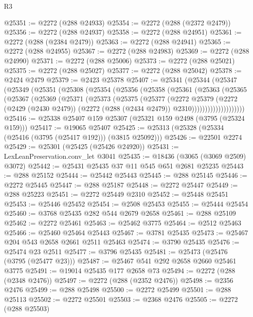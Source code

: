 \begin{lexlean}{R3}
\begin{coremodule}
@25351 := @2272 (@288 @24933)
@25354 := @2272 (@288 (@2372 @2479))
@25356 := @2272 (@288 @24937)
@25358 := @2272 (@288 @24951)
@25361 := @2272 (@288 (@2384 @2479))
@25363 := @2272 (@288 @24941)
@25365 := @2272 (@288 @24955)
@25367 := @2272 (@288 @24983)
@25369 := @2272 (@288 @24990)
@25371 := @2272 (@288 @25006)
@25373 := @2272 (@288 @25021)
@25375 := @2272 (@288 @25027)
@25377 := @2272 (@288 @25042)
@25378 := @2424 @2479
@25379 := @2423 @25378
@25407 := @25341
    (@25344
      (@25347
        (@25349
          (@25351
            (@25308
              (@25354
                (@25356
                  (@25358
                    (@25361
                      (@25363
                        (@25365
                          (@25367
                            (@25369
                              (@25371
                                (@25373
                                  (@25375
                                    (@25377
                                      (@2272
                                        @25379
                                        (@2272
                                          (@2429 (@2430 @2479))
                                          (@2272 (@288 (@2434 @2479)) @2310))))))))))))))))))))
@25416 := @25338 @25407 @159 @25307 (@25321 @159 @2498 (@3795 (@25324 @159)))
@25417 := @19065 @25407
@25425 := @25313 (@25328 (@25334 (@25416 (@3795 (@25417 @192))) (@3815 @25092)))
@25426 := @22501 @2274
@25429 := @25301 (@25425 (@25426 @24920))
@25431 := LexLeanPreservation.conv_let @3041
@25435 := @18436 (@3065 (@3069 @2509) @3072)
@25442 := @25431 @25435 @37 @11 @545 @651 @2681 @25235
@25443 := @288 @25152
@25444 := @25442 @25443
@25445 := @288 @25145
@25446 := @2272 @25445
@25447 := @288 @25187
@25448 := @2272 @25447
@25449 := @288 @25223
@25451 := @2272 @25449 @2310
@25452 := @25448 @25451
@25453 := @25446 @25452
@25454 := @2508 @25453
@25455 := @25444 @25454
@25460 := @3768 @25435 @282 @544 @2679 @2658
@25461 := @288 @25109
@25462 := @2272 @25461
@25463 := @25462 @3775
@25464 := @2512 @25463
@25466 := @25460 @25464 @25443
@25467 := @3781 @25435
@25473 := @25467 @204 @543 @2658 @2661 @2511 @25463
@25474 := @3790 @25435
@25476 := @25474 @23 @2511
@25477 := @3796 @25435
@25481 := @25473 (@25476 (@3795 (@25477 @23)))
@25487 := @25467 @541 @292 @2658 @2660 @25461 @3775
@25491 := @19014 @25435 @177 @2658 @73
@25494 := @2272 (@288 (@2348 @2476))
@25497 := @2272 (@288 (@2352 @2476))
@25498 := @2356 @2476
@25499 := @288 @25498
@25500 := @2272 @25499
@25501 := @288 @25113
@25502 := @2272 @25501
@25503 := @2368 @2476
@25505 := @2272 (@288 @25503)

\end{coremodule}
\end{lexlean}
